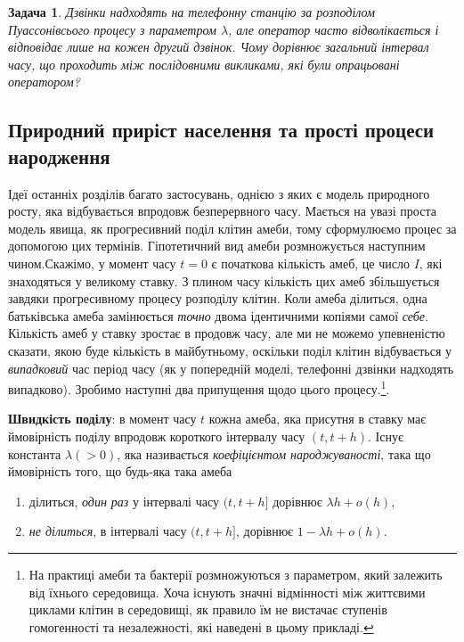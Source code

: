 \documentclass[12pt,fleqn]{article}
\newtheorem{problem}{Задача}[section]
\numberwithin{figure}{section}
\numberwithin{equation}{section}
\begin{document}
\begin{problem}
  Дзвінки надходять на телефонну станцію за розподілом Пуассонівсього процесу з параметром $\lambda$, але оператор часто відволікається і відповідає лише на кожен другий дзвінок. Чому дорівнює загальний інтервал часу, що проходить між послідовними викликами, які були опрацьовані оператором?
\end{problem}

\subsection{Природний приріст населення та прості процеси народження}\label{11.4}
Ідеї останніх розділів багато застосувань, однією з яких є модель природного росту, яка відбувається впродовж безперервного часу. Мається на увазі проста модель явища, як прогресивний поділ клітин амеби, тому сформулюємо процес за допомогою цих термінів. Гіпотетичний вид амеби розмножується наступним чином.Скажімо, у момент часу $t=0$ є початкова кількість амеб, це число $I$, які знаходяться у великому ставку. З плином часу кількість цих амеб збільшується завдяки прогресивному процесу розподілу клітин. Коли амеба ділиться, одна батьківська амеба замінюється \emph{точно} двома ідентичними копіями самої \emph{себе}. Кількість амеб у ставку зростає в продовж часу, але ми не можемо упевненістю сказати, якою буде кількість в майбутньому, оскільки поділ клітин відбувається у \emph{випадковий} час період часу (як у попередній моделі, телефонні дзвінки надходять випадково). Зробимо наступні два припущення щодо цього процесу.\footnote{На практиці амеби та бактерії розмножуються з параметром, який залежить від їхнього середовища. Хоча існують значні відмінності між життєвими циклами клітин в середовищі, як правило їм не вистачає ступенів гомогенності та незалежності, які наведені в цьому прикладі.}.

\textbf{Швидкість поділу}: в момент часу $t$ кожна амеба, яка присутня в ставку має ймовірність поділу впродовж короткого інтервалу часу $(t, t + h)$. Існує константа $\lambda (>0)$, яка називається \emph{коефіцієнтом народжуваності}, така що ймовірність того, що будь-яка така амеба

\begin{enumerate}
  \item ділиться, \emph{один раз} у інтервалі часу $(t, t+ h]$ дорівнює $\lambda h + o(h)$,
  \item \emph{не ділиться}, в інтервалі часу $(t, t+ h]$, дорівнює $1 - \lambda h + o(h)$.
\end{enumerate}
\end{document}
